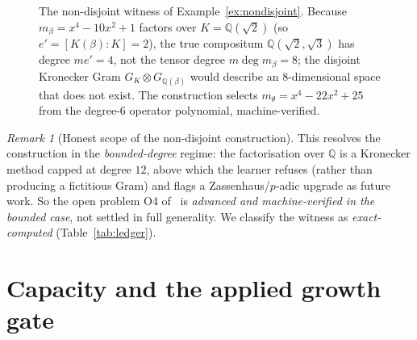 \documentclass[11pt]{article}
\theoremstyle{plain}
\theoremstyle{definition}
\theoremstyle{remark}
\newtheorem{remark}[theorem]{Remark}
\newcommand{\Q}{\mathbb{Q}}
\newcommand{\K}{K}
\newcommand{\GG}{G}
\begin{document}
\begin{figure}[ht]
\centering
{}
\caption{The non-disjoint witness of Example~\ref{ex:nondisjoint}. Because $m_\beta=x^4-10x^2+1$ factors over
$\K=\Q(\sqrt2)$ (so $e'=[\K(\beta):\K]=2$), the true compositum $\Q(\sqrt2,\sqrt3)$ has degree $m e'=4$, not
the tensor degree $m\deg m_\beta=8$; the disjoint Kronecker Gram $\GG_\K\otimes\GG_{\Q(\beta)}$ would describe
an $8$-dimensional space that does not exist. The construction selects $m_\theta=x^4-22x^2+25$ from the
degree-$6$ operator polynomial, machine-verified.}
\label{fig:nondisjoint}
\end{figure}

\begin{remark}[Honest scope of the non-disjoint construction]\label{rem:nondisjoint-scope}
This resolves the construction in the \emph{bounded-degree} regime: the factorisation over $\Q$ is a Kronecker
method capped at degree $12$, above which the learner refuses (rather than producing a fictitious Gram) and
flags a Zassenhaus/$p$-adic upgrade as future work. So the open problem O4 of~\cite{VectorSubstrate} is
\emph{advanced and machine-verified in the bounded case}, not settled in full generality. We classify the
witness as \emph{exact-computed} (Table~\ref{tab:ledger}).
\end{remark}

\section{Capacity and the applied growth gate}\label{sec:capacity}
\end{document}
